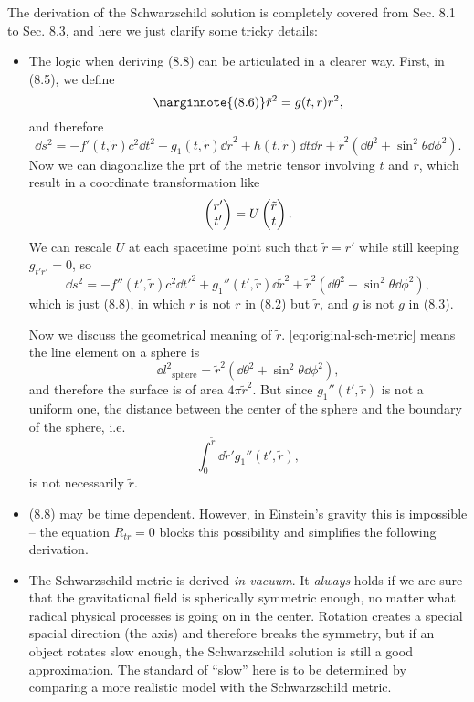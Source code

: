 \documentclass[hyperref, a4paper]{article}
\begin{document}
The derivation of the Schwarzschild solution  is completely covered from Sec. 8.1 to Sec. 8.3,
and here we just clarify some tricky details:
\begin{itemize}
    \item The logic when deriving (8.8)  can be articulated in a clearer way.
    First, in (8.5), we define 
    \begin{equation} \marginnote{(8.6)}
        \tilde{r}^2 = g(t, r) r^2,
    \end{equation}
    and therefore 
    \[
        \dd{s^2} = - f'(t, \tilde{r}) c^2 \dd{t^2} + g_1(t, \tilde{r}) \dd{\tilde{r}^2} + h(t, \tilde{r}) \dd{t} \dd{\tilde{r}} + \tilde{r}^2 (\dd{\theta}^2 + \sin^2 \theta \dd{\phi^2}).
    \]
    Now we can diagonalize the prt of the metric tensor involving $t$ and $r$, which result in a coordinate transformation like 
    \[
        \pmqty{r' \\ t'} = U \pmqty{\tilde{r} \\ t}.
    \]
    We can rescale $U$ at each spacetime point such that $\tilde{r} = r'$ while still keeping $g_{t' r'} = 0$, so 
    \begin{equation}
        \dd{s^2} = - f''(t', \tilde{r}) c^2 \dd{t'^2} + g_1''(t', \tilde{r}) \dd{\tilde{r}^2} + \tilde{r}^2 (\dd{\theta}^2 + \sin^2 \theta \dd{\phi^2}),
        \label{eq:original-sch-metric}
    \end{equation}
    which is just (8.8), in which $r$ is not $r$ in (8.2) but $\tilde{r}$,  
    and $g$ is not $g$ in (8.3).

    Now we discuss the geometrical meaning of $\tilde{r}$. \eqref{eq:original-sch-metric} means the 
    line element on a sphere is 
    \[
        \dd{l^2}_\text{sphere} = \tilde{r}^2 (\dd{\theta^2} + \sin^2 \theta \dd{\phi^2}),
    \]
    and therefore the surface is of area $4 \pi \tilde{r}^2$. But since $g_1''(t', \tilde{r})$ is not a 
    uniform one, the distance between the center of the sphere and the boundary of the sphere, i.e. 
    \[
        \int_0^{\tilde{r}} \dd{\tilde{r}}' g_1''(t', \tilde{r}),
    \]
    is not necessarily $\tilde{r}$. 
    \item (8.8) may be time dependent. However, in Einstein's gravity this is impossible -- the equation 
    $R_{tr} = 0$ blocks this possibility  and simplifies the following derivation.
    \item The Schwarzschild metric is derived \emph{in vacuum}. It \emph{always} holds if we are sure that 
    the gravitational field is spherically symmetric enough, no matter what radical physical processes is going on 
    in the center. Rotation creates a special spacial direction (the axis) and therefore breaks the symmetry,
    but if an object rotates slow enough, the Schwarzschild solution is still a good approximation.
    The standard of ``slow'' here is to be determined by comparing a more realistic model with the Schwarzschild
    metric. 
\end{itemize}
\end{document}
